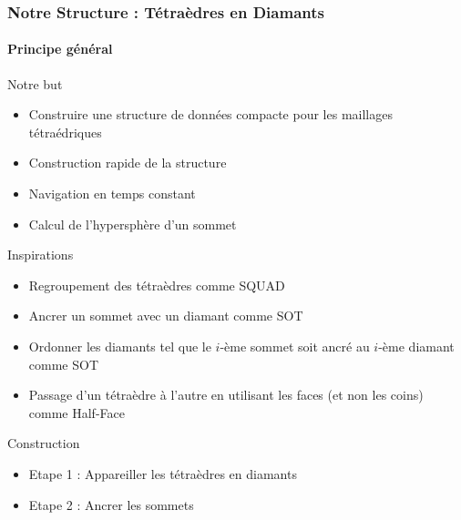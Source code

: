 \documentclass[9pt]{beamer}
\begin{document}
\begin{frame}
\small
\frametitle{Notre Structure : Tétraèdres en Diamants}
\framesubtitle{Principe général}
\small
\begin{block}{Notre but}
\begin{itemize}
\item Construire une structure de données compacte pour les maillages tétraédriques
\item Construction rapide de la structure
\item Navigation en temps constant
\item Calcul de l'hypersphère d'un sommet
\end{itemize}
\end{block}
\begin{block}{Inspirations}
\begin{itemize}
\item Regroupement des tétraèdres comme SQUAD
\item Ancrer un sommet avec un diamant comme SOT
\item Ordonner les diamants tel que le $i$-ème sommet soit ancré au $i$-ème diamant comme SOT
\item Passage d'un tétraèdre à l'autre en utilisant les faces (et non les coins) comme Half-Face\\
\end{itemize}
\end{block}
\begin{block}{Construction}
\begin{itemize}
\item Etape 1 : Appareiller les tétraèdres en diamants
\item Etape 2 : Ancrer les sommets
\end{itemize}
\end{block}
\end{frame}
\end{document}
